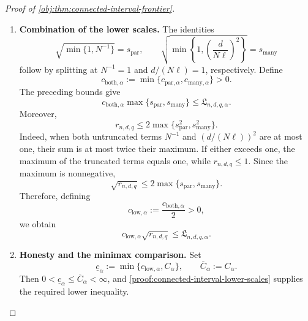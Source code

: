 \documentclass[11pt]{article}
\begin{document}
\begin{proof}[Proof of \cref{obj:thm:connected-interval-frontier}]
\begin{enumerate}
Finally, if \(N<T_{\mathrm{act},\alpha}\), monotonicity of the square
root and reciprocal gives
\[
\min\{1,T_{\mathrm{act},\alpha}^{-1/2}\}
\le s_{\mathrm{par}}.
\]
Using \(s_{\mathrm{many}}\le1\), we obtain
\[
c_{\mathrm{many},\alpha}s_{\mathrm{many}}
\le c_{\mathrm{many},\alpha}
\le
c_{\mathrm{par},\alpha}
\min\{1,T_{\mathrm{act},\alpha}^{-1/2}\}
\le\mathfrak L_{n,d,q,\alpha}.
\]

\item \label{proof:connected-interval-lower-scales}\textbf{Combination of the lower scales.}
The identities
\[
\sqrt{\min\{1,N^{-1}\}}=s_{\mathrm{par}},
\qquad
\sqrt{\min\left\{1,\left(\frac{d}{N\ell}\right)^2\right\}}
=s_{\mathrm{many}}
\]
follow by splitting at \(N^{-1}=1\) and \(d/(N\ell)=1\), respectively.
Define
\[
c_{\mathrm{both},\alpha}
:=\min\{c_{\mathrm{par},\alpha},c_{\mathrm{many},\alpha}\}>0.
\]
The preceding bounds give
\[
c_{\mathrm{both},\alpha}
\max\{s_{\mathrm{par}},s_{\mathrm{many}}\}
\le\mathfrak L_{n,d,q,\alpha}.
\]
Moreover,
\[
r_{n,d,q}
\le2\max\{s_{\mathrm{par}}^2,s_{\mathrm{many}}^2\}.
\]
Indeed, when both untruncated terms \(N^{-1}\) and
\((d/(N\ell))^2\) are at most one, their sum is at most twice their
maximum. If either exceeds one, the maximum of the truncated terms
equals one, while \(r_{n,d,q}\le1\). Since the maximum is nonnegative,
\[
\sqrt{r_{n,d,q}}
\le2\max\{s_{\mathrm{par}},s_{\mathrm{many}}\}.
\]
Therefore, defining
\[
c_{\mathrm{low},\alpha}:=\frac{c_{\mathrm{both},\alpha}}2>0,
\]
we obtain
\[
c_{\mathrm{low},\alpha}\sqrt{r_{n,d,q}}
\le\mathfrak L_{n,d,q,\alpha}.
\]

\item \textbf{Honesty and the minimax comparison.}
Set
\[
\underline c_\alpha
:=\min\{c_{\mathrm{low},\alpha},C_\alpha\},
\qquad
\overline C_\alpha:=C_\alpha.
\]
Then \(0<\underline c_\alpha\le\overline C_\alpha<\infty\), and
\cref{proof:connected-interval-lower-scales} supplies the required lower inequality.


\end{enumerate}
\end{proof}
\end{document}
